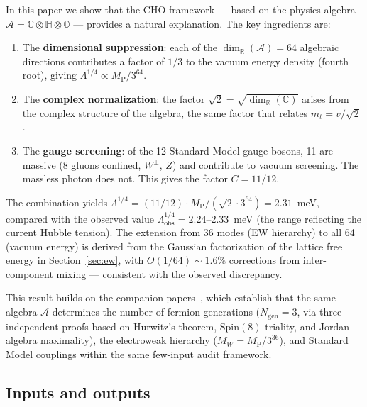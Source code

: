 \documentclass[12pt,a4paper]{article}
\theoremstyle{definition}
\theoremstyle{remark}
\newcommand{\Oct}{\mathbb{O}}
\newcommand{\Quat}{\mathbb{H}}
\newcommand{\Comp}{\mathbb{C}}
\newcommand{\Real}{\mathbb{R}}
\newcommand{\Alg}{\mathcal{A}}
\newcommand{\Spin}{\mathrm{Spin}}
\newcommand{\MP}{M_{\mathrm{P}}}
\begin{document}
In this paper we show that the CHO framework --- based on the physics 
algebra $\Alg = \Comp \otimes \Quat \otimes \Oct$ --- provides a natural 
explanation. The key ingredients are:
\begin{enumerate}
\item The \textbf{dimensional suppression}: each of the 
$\dim_\Real(\Alg) = 64$ algebraic directions contributes a factor of 
$1/3$ to the vacuum energy density (fourth root), giving 
$\Lambda^{1/4} \propto \MP/3^{64}$.
\item The \textbf{complex normalization}: the factor $\sqrt{2} = 
\sqrt{\dim_\Real(\Comp)}$ arises from the complex structure of the 
algebra, the same factor that relates $m_t = v/\sqrt{2}$.
\item The \textbf{gauge screening}: of the 12 Standard Model gauge bosons, 
11 are massive (8 gluons confined, $W^\pm$, $Z$) and contribute to 
vacuum screening. The massless photon does not. This gives the factor 
$C = 11/12$.
\end{enumerate}

The combination yields $\Lambda^{1/4} = (11/12)\cdot\MP/(\sqrt{2}\cdot 
3^{64}) = 2.31$~meV, compared with the observed value 
$\Lambda^{1/4}_{\mathrm{obs}} = 2.24$--$2.33$~meV (the range reflecting 
the current Hubble tension). The extension from 36 modes (EW hierarchy) to 
all 64 (vacuum energy) is derived from the Gaussian factorization of the 
lattice free energy in Section~\ref{sec:ew}, with $O(1/64) \sim 1.6\%$ 
corrections from inter-component mixing --- consistent with the observed 
discrepancy.

This result builds on the companion papers~\cite{Paper1,Paper2}, which 
establish that the same algebra $\Alg$ determines the number of fermion 
generations ($N_{\mathrm{gen}} = 3$, via three independent proofs based on 
Hurwitz's theorem, $\Spin(8)$ triality, and Jordan algebra maximality), 
the electroweak hierarchy ($M_W = \MP/3^{36}$), and Standard Model couplings 
within the same few-input audit framework.

\subsection*{Inputs and outputs}
\end{document}
